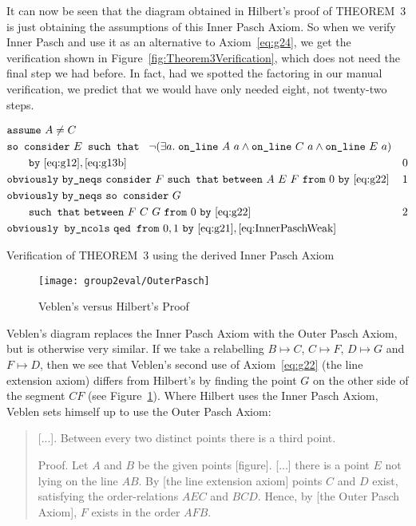 It can now be seen that the diagram obtained in Hilbert's proof of THEOREM~3 is just obtaining the assumptions of this Inner Pasch Axiom. So when we verify Inner Pasch and use it as an alternative to Axiom~\ref{eq:g24}, we get the verification shown in Figure~\ref{fig:Theorem3Verification}, which does not need the final step we had before. In fact, had we spotted the factoring in our manual verification, we predict that we would have only needed eight, not twenty-two steps.

\begin{boxedfigure}
\begin{align*}
  &\code{assume}\ A\neq C\\
  &\code{so consider}\ E \code{ such that }\ \Triangle{a}{A}{C}{E}\\
  &\qquad\code{by}\ \eqref{eq:g12},\eqref{eq:g13b}& 0\\
  &\code{obviously}\ \code{by\_neqs}\ \code{consider}\ F\ \code{such that}\ \between{A}{E}{F}\ \code{from}\ 0\ \code{by}\ \eqref{eq:g22} & 1\\
  &\code{obviously}\ \code{by\_neqs}\ \code{so consider}\ G\\
  &\qquad\code{such that}\ \between{F}{C}{G}\ \code{from}\ 0\ \code{by}\ \eqref{eq:g22} & 2\\
  &\code{obviously by\_ncols}\ \code{qed from}\ 0,1\ \code{by}\ \eqref{eq:g21},\eqref{eq:InnerPaschWeak}
\end{align*}
\caption{Verification of THEOREM~3 using the derived Inner Pasch Axiom}
\label{fig:Theorem3Verification}
\end{boxedfigure}

\begin{figure}
\centering\texttt{[image: group2eval/OuterPasch]}
\caption{Veblen's versus Hilbert's Proof}
\label{fig:VeblenHilbert}
\end{figure}

Veblen's diagram replaces the Inner Pasch Axiom with the Outer Pasch Axiom, but is otherwise very similar. If we take a relabelling $B \mapsto C$, $C \mapsto F$, $D \mapsto G$ and $F \mapsto D$, then we see that Veblen's second use of Axiom~\ref{eq:g22} (the line extension axiom) differs from Hilbert's by finding the point $G$ on the other side of the segment $CF$ (see Figure~\ref{fig:VeblenHilbert}). Where Hilbert uses the Inner Pasch Axiom, Veblen sets himself up to use the Outer Pasch Axiom:

\begin{quotation}\label{sec:VeblenThree}
[...]. Between every two distinct points there is a third point.

Proof. Let $A$ and $B$ be the given points [figure]. [...] there is a point $E$ not lying on the line $AB$. By [the line extension axiom] points $C$ and $D$ exist, satisfying the order-relations $AEC$ and $BCD$. Hence, by [the Outer Pasch Axiom], $F$ exists in the order $AFB$.
\vspace{0.5cm}
\end{quotation}

